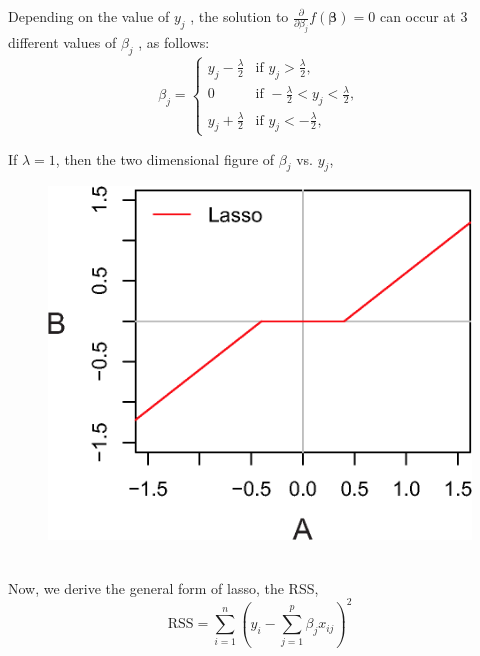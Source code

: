 \documentclass[12pt,a4paper]{article}%
\theoremstyle{definition}
\theoremstyle{plain}
\numberwithin{equation}{section}
\newcounter{subsubsubsection}[subsubsection]
\begin{document}
Depending on the value of $y_{j}$ , the solution to $\frac{\partial}{\partial \beta_{j}} f(\boldsymbol{\beta}) =0$ can occur at 3 different values of $\beta_{j}$ , as follows:
\begin{equation*}
\beta_{j} = \left\{
\begin{array}{ll}
y_{j}-\frac{\lambda}{2}   & \mbox{if }  y_{j} > \frac{\lambda}{2}, \\
 0 & \mbox{if } -\frac{\lambda}{2}<y_{j}< \frac{\lambda}{2}, \\
y_{j}+\frac{\lambda}{2}   & \mbox{if } y_{j} < -\frac{\lambda}{2},
\end{array} \right.
\end{equation*}

If $\lambda = 1$, then the two dimensional figure of $\beta_{j}$ vs. $y_{j}$,
\begin{figure}[H]
\centering
{}
\includegraphics[scale=0.8]{images//6_10.eps}
\\~\\
\caption{ }\label{softThresholding}
\end{figure}

Now, we derive the general form of lasso, the RSS,
\begin{equation}
\text{RSS} =  \sum\limits_{i=1}^{n} (y_{i}- \sum\limits_{j=1}^{p} \beta_{j} x_{ij})^{2}
\end{equation}
\end{document}
